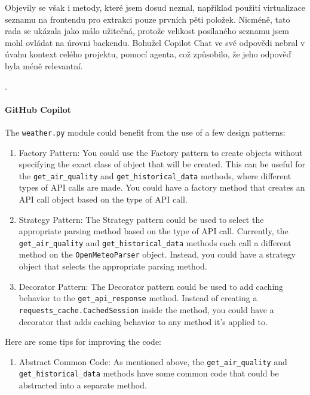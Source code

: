 \documentclass[FM,DP]{tulthesis}
\begin{document}
		
		Objevily se však i metody, které jsem dosud neznal, například použití virtualizace seznamu na frontendu pro extrakci pouze prvních pěti položek. Nicméně, tato rada se ukázala jako málo užitečná, protože velikost posílaného seznamu jsem mohl ovládat na úrovni backendu. Bohužel Copilot Chat ve své odpovědi nebral v úvahu kontext celého projektu, pomocí agenta, což způsobilo, že jeho odpověď byla méně relevantní.
		
		\cite{enum}.
		\vspace{0.6em}
		\begin{tcolorbox}[colback=white,colframe=black]
			\paragraph{GitHub Copilot}
			
			The \verb|weather.py| module could benefit from the use of a few design patterns:
			
			\begin{enumerate}
				\item Factory Pattern: You could use the Factory pattern to create objects without specifying the exact class of object that will be created. This can be useful for the \verb|get_air_quality| and \verb|get_historical_data| methods, where different types of API calls are made. You could have a factory method that creates an API call object based on the type of API call.
				
				\item Strategy Pattern: The Strategy pattern could be used to select the appropriate parsing method based on the type of API call. Currently, the \verb|get_air_quality| and \verb|get_historical_data| methods each call a different method on the \verb|OpenMeteoParser| object. Instead, you could have a strategy object that selects the appropriate parsing method.
				
				\item Decorator Pattern: The Decorator pattern could be used to add caching behavior to the \verb|get_api_response| method. Instead of creating a \verb|requests_cache.CachedSession| inside the method, you could have a decorator that adds caching behavior to any method it's applied to.
			\end{enumerate}
			
			Here are some tips for improving the code:
			
			\begin{enumerate}
				\item Abstract Common Code: As mentioned above, the \verb|get_air_quality| and \verb|get_historical_data| methods have some common code that could be abstracted into a separate method.
				

\end{enumerate}
\end{tcolorbox}
\end{document}
